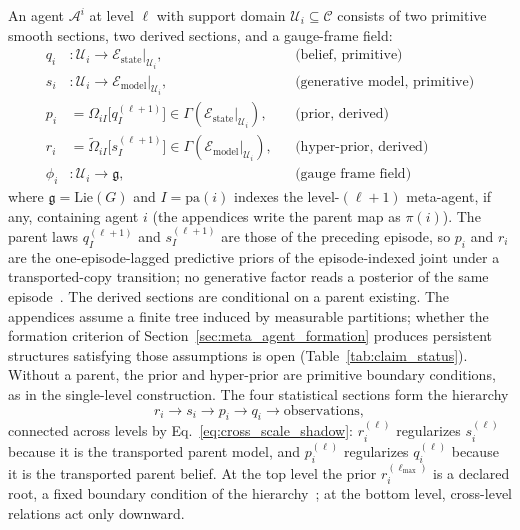 \begin{definition}[Agent]
An agent $\mathcal{A}^i$ at level $\ell$ with support domain $\mathcal{U}_i \subseteq \mathcal{C}$ consists of two primitive smooth sections, two derived sections, and a gauge-frame field:
\begin{align}
q_i &: \mathcal{U}_i \to \mathcal{E}_{\mathrm{state}}|_{\mathcal{U}_i}, &&\text{(belief, primitive)} \\
s_i &: \mathcal{U}_i \to \mathcal{E}_{\mathrm{model}}|_{\mathcal{U}_i}, &&\text{(generative model, primitive)} \\
p_i &= \Omega_{iI}\big[q_I^{(\ell+1)}\big] \in \Gamma\left(\mathcal{E}_{\mathrm{state}}|_{\mathcal{U}_i}\right), &&\text{(prior, derived)} \\
r_i &= \tilde\Omega_{iI}\big[s_I^{(\ell+1)}\big] \in \Gamma\left(\mathcal{E}_{\mathrm{model}}|_{\mathcal{U}_i}\right), &&\text{(hyper-prior, derived)} \\
\phi_i &: \mathcal{U}_i \to \mathfrak{g}, &&\text{(gauge frame field)}
\end{align}
where $\mathfrak{g}=\mathrm{Lie}(G)$ and $I=\mathrm{pa}(i)$ indexes the level-$(\ell+1)$ meta-agent, if any, containing agent $i$ (the appendices write the parent map as $\pi(i)$). The parent laws $q_I^{(\ell+1)}$ and $s_I^{(\ell+1)}$ are those of the preceding episode, so $p_i$ and $r_i$ are the one-episode-lagged predictive priors of the episode-indexed joint under a transported-copy transition; no generative factor reads a posterior of the same episode~\cite[Ch.~12]{DennisGaugeVFE2026}. The derived sections are conditional on a parent existing. The appendices assume a finite tree induced by measurable partitions; whether the formation criterion of Section~\ref{sec:meta_agent_formation} produces persistent structures satisfying those assumptions is open (Table~\ref{tab:claim_status}). Without a parent, the prior and hyper-prior are primitive boundary conditions, as in the single-level construction. The four statistical sections form the hierarchy
\[
r_i \to s_i \to p_i \to q_i \to \text{observations},
\]
connected across levels by Eq.~\eqref{eq:cross_scale_shadow}: $r_i^{(\ell)}$ regularizes $s_i^{(\ell)}$ because it is the transported parent model, and $p_i^{(\ell)}$ regularizes $q_i^{(\ell)}$ because it is the transported parent belief. At the top level the prior $r_i^{(\ell_{\max})}$ is a declared root, a fixed boundary condition of the hierarchy~\cite[Ch.~12]{DennisGaugeVFE2026}; at the bottom level, cross-level relations act only downward.
\end{definition}

